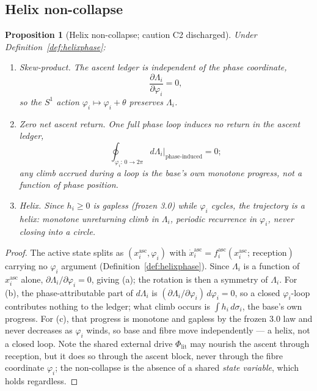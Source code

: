 \documentclass[11pt,a4paper]{article}
\theoremstyle{definition}
\theoremstyle{plain}
\newtheorem{proposition}[definition]{Proposition}
\theoremstyle{remark}
\begin{document}
\subsection{Helix non-collapse}

\begin{proposition}[Helix non-collapse; caution C2 discharged]\label{prop:noncollapse}
Under Definition~\ref{def:helixphase}:
\begin{enumerate}[label=\textup{(\alph*)},leftmargin=1.2cm]
\item \emph{Skew-product.} The ascent ledger is independent of the phase coordinate,
\[
\frac{\partial\Lambda_i}{\partial\varphi_i}=0,
\]
so the \(S^1\) action \(\varphi_i\mapsto\varphi_i+\theta\) preserves \(\Lambda_i\).
\item \emph{Zero net ascent return.} One full phase loop induces no return in the ascent
ledger,
\[
\oint_{\varphi_i:\,0\to2\pi} d\Lambda_i\Big|_{\text{phase-induced}}=0;
\]
any climb accrued during a loop is the base's own monotone progress, not a function of phase
position.
\item \emph{Helix.} Since \(h_i\ge0\) is gapless (frozen 3.0) while \(\varphi_i\) cycles, the
trajectory is a helix: monotone unreturning climb in \(\Lambda_i\), periodic recurrence in
\(\varphi_i\), never closing into a circle.
\end{enumerate}
\end{proposition}

\begin{proof}
The active state splits as \((x_i^{\mathrm{asc}},\varphi_i)\) with
\(\dot x_i^{\mathrm{asc}}=f_i^{\mathrm{asc}}(x_i^{\mathrm{asc}};\,\text{reception})\) carrying
no \(\varphi_i\) argument (Definition~\ref{def:helixphase}). Since \(\Lambda_i\) is a function
of \(x_i^{\mathrm{asc}}\) alone, \(\partial\Lambda_i/\partial\varphi_i=0\), giving (a); the
rotation is then a symmetry of \(\Lambda_i\). For (b), the phase-attributable part of
\(d\Lambda_i\) is \((\partial\Lambda_i/\partial\varphi_i)\,d\varphi_i=0\), so a closed
\(\varphi_i\)-loop contributes nothing to the ledger; what climb occurs is
\(\int h_i\,d\sigma_i\), the base's own progress. For (c), that progress is monotone and
gapless by the frozen 3.0 law and never decreases as \(\varphi_i\) winds, so base and fibre
move independently --- a helix, not a closed loop. Note the shared external drive
\(\Phi_{\mathrm{lit}}\) may nourish the ascent through reception, but it does so through the
ascent block, never through the fibre coordinate \(\varphi_i\); the non-collapse is the
absence of a shared \emph{state variable}, which holds regardless. \qedhere
\end{proof}
\end{document}

